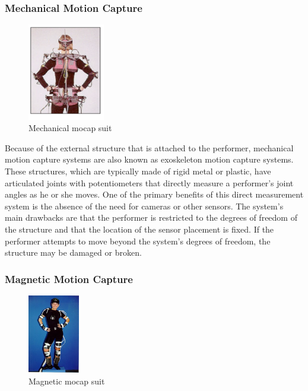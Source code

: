 \subsubsection*{Mechanical Motion Capture}

\begin{figure}[h]
	\centering
	\includegraphics[width=0.3\textwidth]{figures/Mechanical.png}
	\caption{Mechanical mocap suit}
\end{figure}

Because of the external structure \cite{MOTION CAPTURE TO BUILD A FOUNDATION FOR A COMPUTER-CONTROLLED INSTRUMENT BY STUDY OF CLASSICAL GUITAR PERFORMANCE} that is attached to the performer, mechanical motion capture systems are also known as exoskeleton motion capture systems. These structures, which are typically made of rigid metal or plastic, have articulated joints with potentiometers that directly measure a performer's joint angles as he or she moves. One of the primary benefits of this direct measurement system is the absence of the need for cameras or other sensors. The system's main drawbacks are that the performer is restricted to the degrees of freedom of the structure and that the location of the sensor placement is fixed. If the performer attempts to move beyond the system's degrees of freedom, the structure may be damaged or broken.

\subsubsection*{Magnetic Motion Capture}

\begin{figure}[h]
	\centering
	\includegraphics[width=0.2\textwidth]{figures/Magnetic.png}
	\caption{Magnetic mocap suit}
\end{figure}

